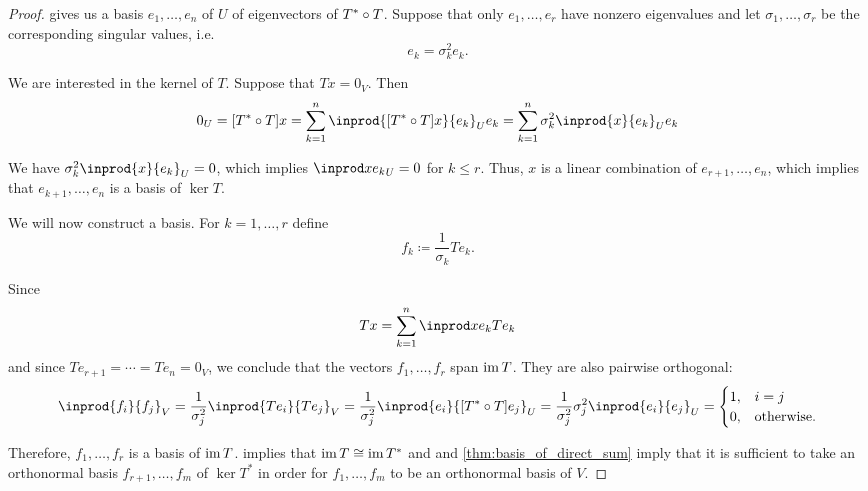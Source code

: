 \begin{proof}
    gives us a basis \( e_1, \ldots, e_n \) of \( U \) of eigenvectors of \( T^* \bincirc T \). Suppose that only \( e_1, \ldots, e_r \) have nonzero eigenvalues and let \( \sigma_1, \ldots, \sigma_r \) be the corresponding singular values, i.e.
  \begin{equation*}
    [T^* \bincirc T] e_k = \sigma_k^2 e_k.
  \end{equation*}

  We are interested in the kernel of \( T \). Suppose that \( Tx = 0_V \). Then
  \begin{equation*}
    0_U
    =
    [T^* \bincirc T] x
    =
    \sum_{k=1}^n \inprod { [T^* \bincirc T]x } { e_k }_U e_k
    =
    \sum_{k=1}^n \sigma_k^2 \inprod { x } { e_k }_U e_k
  \end{equation*}

  We have \( \sigma_k^2 \inprod { x } { e_k }_U = 0 \), which implies \( \inprod x { e_k }_U = 0 \) for \( k \leq r \). Thus, \( x \) is a linear combination of \( e_{r+1}, \ldots, e_n \), which implies that \( e_{k+1}, \ldots, e_n \) is a basis of \( \ker T \).

  We will now construct a basis. For \( k = 1, \ldots, r \) define
  \begin{equation*}
    f_k \coloneqq \frac 1 {\sigma_k} T e_k.
  \end{equation*}

  Since
  \begin{equation*}
    T x = \sum_{k=1}^n \inprod x { e_k } T e_k
  \end{equation*}
  and since \( T e_{r+1} = \cdots = T e_n = 0_V \), we conclude that the vectors \( f_1, \ldots, f_r \) span \( \operatorname{im} T \). They are also pairwise orthogonal:
  \begin{equation*}
    \inprod { f_i } { f_j }_V
    =
    \frac 1 {\sigma_j^2} \inprod { T e_i } { T e_j }_V
    =
    \frac 1 {\sigma_j^2} \inprod { e_i } { [T^* \bincirc T] e_j }_U
    =
    \frac 1 {\sigma_j^2} {\sigma_j^2} \inprod { e_i } { e_j }_U
    =
    \begin{cases}
      1, &i = j \\
      0, &\T{otherwise.}
    \end{cases}
  \end{equation*}

  Therefore, \( f_1, \ldots, f_r \) is a basis of \( \operatorname{im} T \).  implies that \( \operatorname{im} T \cong \operatorname{im} T^* \) and  and \cref{thm:basis_of_direct_sum} imply that it is sufficient to take an orthonormal basis \( f_{r+1}, \ldots, f_m \) of \( \ker T^* \) in order for \( f_1, \ldots, f_m \) to be an orthonormal basis of \( V \).


\end{proof}
